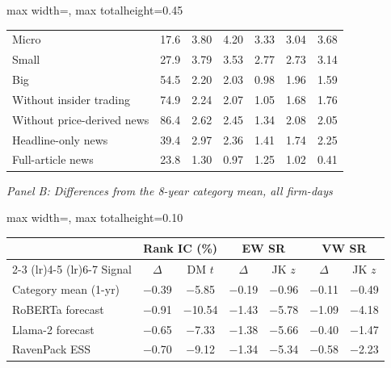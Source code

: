 \begin{table}[htbp]
{\begin{adjustbox}{max width=\linewidth, max totalheight=0.45\textheight}
\begin{tabular}{lcccccc}
Micro & \phantom{0}17.6 & 3.80 & 4.20 & 3.33 & 3.04 & 3.68 \\
Small & \phantom{0}27.9 & 3.79 & 3.53 & 2.77 & 2.73 & 3.14 \\
Big & \phantom{0}54.5 & 2.20 & 2.03 & 0.98 & 1.96 & 1.59 \\
Without insider trading & \phantom{0}74.9 & 2.24 & 2.07 & 1.05 & 1.68 & 1.76 \\
Without price-derived news & \phantom{0}86.4 & 2.62 & 2.45 & 1.34 & 2.08 & 2.05 \\
Headline-only news & \phantom{0}39.4 & 2.97 & 2.36 & 1.41 & 1.74 & 2.25 \\
Full-article news & \phantom{0}23.8 & 1.30 & 0.97 & 1.25 & 1.02 & 0.41 \\
\bottomrule
\end{tabular}
\end{adjustbox}
\par\medskip
\textit{Panel B: Differences from the 8-year category mean, all firm-days}\\[2pt]
\begin{adjustbox}{max width=\linewidth, max totalheight=0.10\textheight}
\begin{tabular}{lcccccc}
\toprule
 & \multicolumn{2}{c}{Rank IC (\%)} & \multicolumn{2}{c}{EW SR} & \multicolumn{2}{c}{VW SR} \\
\cmidrule(lr){2-3} \cmidrule(lr){4-5} \cmidrule(lr){6-7}
Signal & $\Delta$ & DM $t$ & $\Delta$ & JK $z$ & $\Delta$ & JK $z$ \\
\midrule
Category mean (1-yr) & $-$0.39 & \phantom{0}$-$5.85 & $-$0.19 & $-$0.96 & $-$0.11 & $-$0.49 \\
RoBERTa forecast & $-$0.91 & $-$10.54 & $-$1.43 & $-$5.78 & $-$1.09 & $-$4.18 \\
Llama-2 forecast & $-$0.65 & \phantom{0}$-$7.33 & $-$1.38 & $-$5.66 & $-$0.40 & $-$1.47 \\
RavenPack ESS & $-$0.70 & \phantom{0}$-$9.12 & $-$1.34 & $-$5.34 & $-$0.58 & $-$2.23 \\
\bottomrule
\end{tabular}
\end{adjustbox}
}
\end{table}
